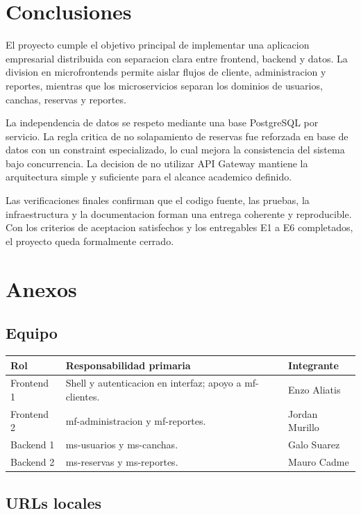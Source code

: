 \documentclass[12pt,a4paper]{article}
\begin{document}
\section{Conclusiones}

El proyecto cumple el objetivo principal de implementar una aplicacion empresarial distribuida con separacion clara entre frontend, backend y datos. La division en microfrontends permite aislar flujos de cliente, administracion y reportes, mientras que los microservicios separan los dominios de usuarios, canchas, reservas y reportes.

La independencia de datos se respeto mediante una base PostgreSQL por servicio. La regla critica de no solapamiento de reservas fue reforzada en base de datos con un constraint especializado, lo cual mejora la consistencia del sistema bajo concurrencia. La decision de no utilizar API Gateway mantiene la arquitectura simple y suficiente para el alcance academico definido.

Las verificaciones finales confirman que el codigo fuente, las pruebas, la infraestructura y la documentacion forman una entrega coherente y reproducible. Con los criterios de aceptacion satisfechos y los entregables E1 a E6 completados, el proyecto queda formalmente cerrado.

\section{Anexos}

\subsection{Equipo}

\begin{longtable}{p{3cm}p{5cm}p{5cm}}
\textbf{Rol} & \textbf{Responsabilidad primaria} & \textbf{Integrante} \\
\hline
Frontend 1 & Shell y autenticacion en interfaz; apoyo a mf-clientes. & Enzo Aliatis \\
Frontend 2 & mf-administracion y mf-reportes. & Jordan Murillo \\
Backend 1 & ms-usuarios y ms-canchas. & Galo Suarez \\
Backend 2 & ms-reservas y ms-reportes. & Mauro Cadme \\
\end{longtable}

\subsection{URLs locales}
\end{document}
